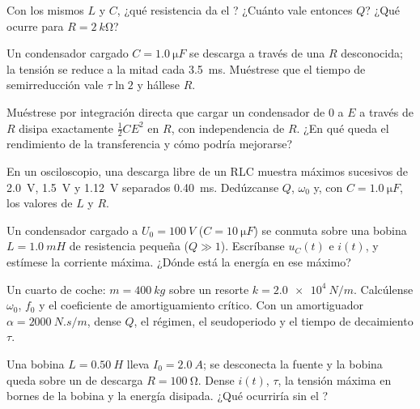 \begin{exercise}[$\star$]\label{exo:b1:transient-regimes:4}
Con los mismos $L$ y $C$, ¿qué resistencia da el ? ¿Cuánto
vale entonces $Q$? ¿Qué ocurre para $R = \qty{2}{k\ohm}$?
\end{exercise}

\begin{exercise}[$\star\star$]\label{exo:b1:transient-regimes:5}
Un condensador cargado $C = \qty{1.0}{\micro F}$ se descarga a través de
una $R$ desconocida; la tensión se reduce a la mitad cada \qty{3.5}{ms}.
Muéstrese que el tiempo de semirreducción vale $\tau\ln 2$ y hállese $R$.
\end{exercise}

\begin{exercise}[$\star\star$]\label{exo:b1:transient-regimes:6}
Muéstrese por integración directa que cargar un condensador de $0$ a $E$ a
través de $R$ disipa exactamente $\tfrac12 CE^2$ en $R$, con independencia
de $R$. ¿En qué queda el rendimiento de la transferencia y cómo podría
mejorarse?
\end{exercise}

\begin{exercise}[$\star\star$]\label{exo:b1:transient-regimes:7}
En un osciloscopio, una descarga libre de un RLC muestra máximos
sucesivos de \qty{2.0}{V}, \qty{1.5}{V} y \qty{1.12}{V} separados
\qty{0.40}{ms}. Dedúzcanse $Q$, $\omega_0$ y, con
$C = \qty{1.0}{\micro F}$, los valores de $L$ y $R$.
\end{exercise}

\begin{exercise}[$\star\star$]\label{exo:b1:transient-regimes:8}
Un condensador cargado a $U_0 = \qty{100}{V}$ ($C = \qty{10}{\micro F}$)
se conmuta sobre una bobina $L = \qty{1.0}{mH}$ de resistencia pequeña
($Q \gg 1$). Escríbanse $u_C(t)$ e $i(t)$, y estímese la corriente máxima.
¿Dónde está la energía en ese máximo?
\end{exercise}

\begin{exercise}[$\star\star$]\label{exo:b1:transient-regimes:9}
Un cuarto de coche: $m = \qty{400}{kg}$ sobre un resorte $k = \qty{2.0e4}{N/m}$.
Calcúlense $\omega_0$, $f_0$ y el coeficiente de amortiguamiento crítico.
Con un amortiguador $\alpha = \qty{2000}{N.s/m}$, dense $Q$, el régimen, el
seudoperiodo y el tiempo de decaimiento $\tau$.
\end{exercise}

\begin{exercise}[$\star\star\star$]\label{exo:b1:transient-regimes:10}
Una bobina $L = \qty{0.50}{H}$ lleva $I_0 = \qty{2.0}{A}$; se desconecta la
fuente y la bobina queda sobre un  de descarga $R = \qty{100}{\ohm}$.
Dense $i(t)$, $\tau$, la tensión máxima en bornes de la bobina y la
energía disipada. ¿Qué ocurriría sin el ?
\end{exercise}

